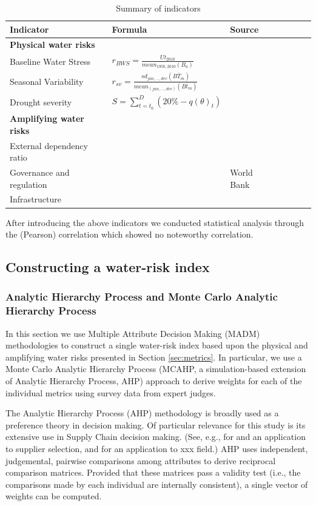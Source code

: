 \documentclass[a4paper]{article}
\begin{document}
\begin{table}[t]
\centering
\caption{Summary of indicators}
\label{tab:inv_regression} 
\resizebox{10cm}{!} {
\begin{tabular} { l l l l l l l } 
\toprule
Indicator & Formula & Source \\
\midrule
\textbf{Physical water risks} & & \\
Baseline Water Stress & $r_{BWS}=\frac{Ut_{2010}}{\mathit{mean}_{1950,2010}(B_a)}$ & \citet{Gassert:2014} \\
Seasonal Variability & $r_{sv}=\frac{\mathit{sd}_{jan,\dots,dec}(\bar{BT_m})}{\mathit{mean}_{(jan,\dots,dec)}(\bar{Bt_m})}$ & \citet{Gassert:2014} \\
Drought severity & $S= \sum_{t=t_0}^{D} (20\%-q(\theta)_t)$ & \citet{Gassert:2014} \\
\textbf{Amplifying water risks} && \\
External dependency ratio & & \citet{FAO:2016}\\
Governance and regulation & & World Bank \\
Infrastructure & & \citet{Diop:2002}\\
\bottomrule                                                                                                                                                 
\end{tabular}
}
\end{table}
After introducing the above indicators we conducted statistical analysis through the (Pearson) correlation which showed no noteworthy correlation.


\subsection{Constructing a water-risk index}
\subsubsection{Analytic Hierarchy Process and Monte Carlo Analytic Hierarchy Process}
In this section we use Multiple Attribute Decision Making (MADM) methodologies to construct a single water-risk index based upon the physical and amplifying water risks presented in Section \ref{sec:metrics}.
In particular, we use a Monte Carlo Analytic Hierarchy Process (MCAHP, a simulation-based extension of Analytic Hierarchy Process, AHP) approach to derive weights for each of the individual metrics using survey data from expert judges.

The Analytic Hierarchy Process (AHP) methodology is broadly used as a preference theory in decision making.
Of particular relevance for this study is its extensive use in Supply Chain decision making.
(See, e.g., \citet{Ishizaka:2011} for and an application to supplier selection, and \citet{Momani:2011} for an application to xxx field.)
AHP uses independent, judgemental, pairwise comparisons among attributes to derive reciprocal comparison matrices.
Provided that these matrices pass a validity test (i.e., the comparisons made by each individual are internally consistent), a single vector of weights can be computed.
\end{document}

